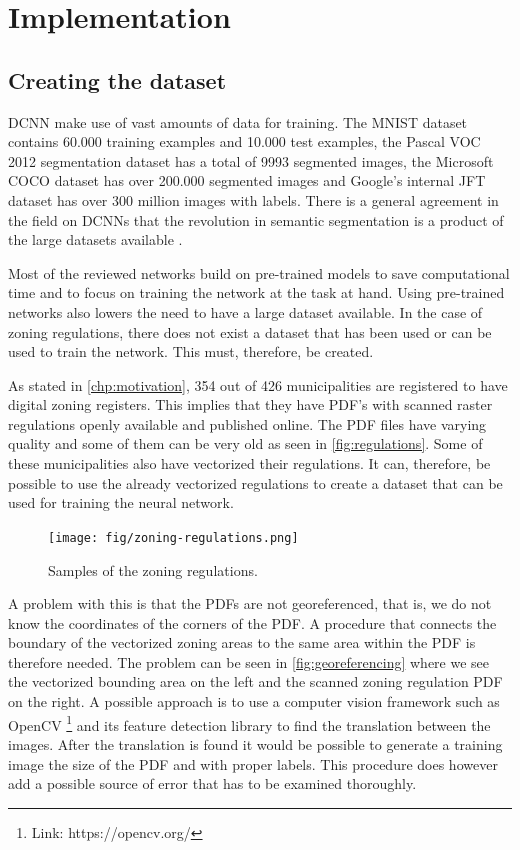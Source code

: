 \chapter{Implementation}

\section{Creating the dataset}\label{chp:dataset}
DCNN make use of vast amounts of data for training. The MNIST dataset contains 60.000 training examples and 10.000 test examples, the Pascal VOC 2012 segmentation dataset \cite{PASCALVOC2012} has a total of 9993 segmented images, the Microsoft COCO dataset \cite{Lin2014} has over 200.000 segmented images and Google's internal JFT dataset \cite{Hinton2015} has over 300 million images with labels. There is a general agreement in the field on DCNNs that the revolution in semantic segmentation is a product of the large datasets available \cite{Sun2017}.

Most of the reviewed networks build on pre-trained models to save computational time and to focus on training the network at the task at hand. Using pre-trained networks also lowers the need to have a large dataset available. In the case of zoning regulations, there does not exist a dataset that has been used or can be used to train the network. This must, therefore, be created.

As stated in \autoref{chp:motivation}, 354 out of 426 municipalities are registered to have digital zoning registers. This implies that they have PDF's with scanned raster regulations openly available and published online. The PDF files have varying quality and some of them can be very old as seen in \autoref{fig:regulations}. Some of these municipalities also have vectorized their regulations. It can, therefore, be possible to use the already vectorized regulations to create a dataset that can be used for training the neural network.

\begin{figure}[H]
	\centering
	\texttt{[image: fig/zoning-regulations.png]}
	\caption{Samples of the zoning regulations.}
	\label{fig:regulations}
\end{figure}

A problem with this is that the PDFs are not georeferenced, that is, we do not know the coordinates of the corners of the PDF. A procedure that connects the boundary of the vectorized zoning areas to the same area within the PDF is therefore needed. The problem can be seen in \autoref{fig:georeferencing} where we see the vectorized bounding area on the left and the scanned zoning regulation PDF on the right. A possible approach is to use a computer vision framework such as OpenCV \footnote{Link: https://opencv.org/} and its feature detection library to find the translation between the images. After the translation is found it would be possible to generate a training image the size of the PDF and with proper labels. This procedure does however add a possible source of error that has to be examined thoroughly.  

